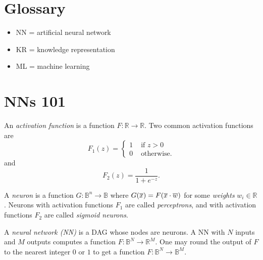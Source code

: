 \documentclass[a4paper,10pt]{article}
\def\bool{\mathbb{B}}
\def\real{\mathbb{R}}
\begin{document}
\section*{Glossary}

\begin{itemize}
 \item NN = artificial neural network

\item KR = knowledge representation

\item ML = machine learning

\end{itemize}



\section{NNs 101}
An \emph{activation function} is a function $F:\real \to \real$. Two common activation functions are
\[
 F_1(z) = \begin{cases}
         1 & \mbox{ if } z > 0\\
         0 & \mbox{ otherwise.}
        \end{cases}
\]
and
\[
 F_2(z) = \frac{1}{1+e^{-z}}.
\]

A \emph{neuron} is a function $G:\bool^n \to \bool$ where $G(\overline{x}) = F(\overline{x} \cdot \overline{w})$ for some
\emph{weights} $w_i \in \real$. Neurons with activation functions $F_1$ are called \emph{perceptrons}, and with activation functions $F_2$ are
called \emph{sigmoid neurons}.

% 
A \emph{neural network (NN)} is a DAG whose nodes are neurons. A NN with $N$ inputs and $M$ outputs 
computes a function $F:\bool^N \to \real^M$. One may round the output of $F$ to the nearest integer $0$ or $1$ to get a function $F:\bool^N \to \bool^M$.
\end{document}
